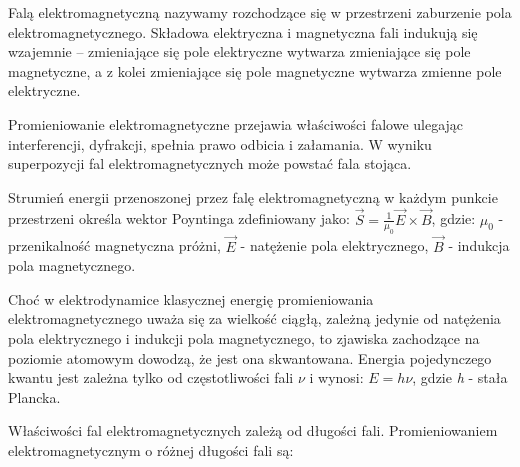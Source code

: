 Falą elektromagnetyczną nazywamy rozchodzące się w przestrzeni zaburzenie pola elektromagnetycznego. Składowa elektryczna i magnetyczna fali indukują się wzajemnie – zmieniające się pole elektryczne wytwarza zmieniające się pole magnetyczne, a z kolei zmieniające się pole magnetyczne wytwarza zmienne pole elektryczne.

Promieniowanie elektromagnetyczne przejawia właściwości falowe ulegając interferencji, dyfrakcji, spełnia prawo odbicia i załamania. W wyniku superpozycji fal elektromagnetycznych może powstać fala stojąca. 

Strumień energii przenoszonej przez falę elektromagnetyczną w każdym punkcie przestrzeni określa wektor Poyntinga zdefiniowany jako:\newline
$ \vec{S} = \frac{1}{\mu_0} \vec{E} \times \vec{B} $,\newline
gdzie:\newline
$ \mu_0 $ - przenikalność magnetyczna próżni,\newline
$ \vec{E} $ - natężenie pola elektrycznego,\newline
$ \vec{B} $ - indukcja pola magnetycznego.

Choć w elektrodynamice klasycznej energię promieniowania elektromagnetycznego uważa się za wielkość ciągłą, zależną jedynie od natężenia pola elektrycznego i indukcji pola magnetycznego, to zjawiska zachodzące na poziomie atomowym dowodzą, że jest ona skwantowana. Energia pojedynczego kwantu jest zależna tylko od częstotliwości fali $ \nu $ i wynosi:\newline
$ E = h \nu $, gdzie \textit{h} - stała Plancka.

Właściwości fal elektromagnetycznych zależą od długości fali. Promieniowaniem elektromagnetycznym o różnej długości fali są:
 
